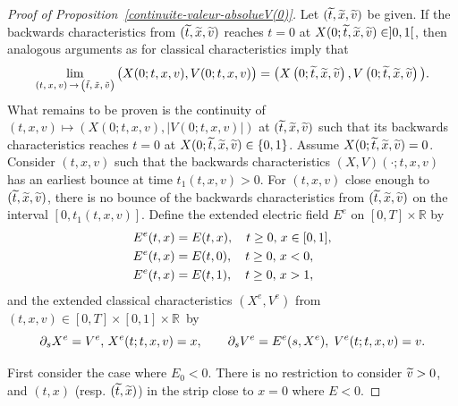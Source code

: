 \documentclass[10pt]{amsart}
\theoremstyle{definition}\newtheorem{defi}[theo]{Definition}\newtheorem{rema}[theo]{Remark}\newtheorem{exam}[theo]{Example}\newtheorem{exem}[theo]{Example}\newtheorem{nota}[theo]{Notation}
\newcommand{\R}{\mathbb{R}}
\let\oldtilde\tilde
\renewcommand*{\tilde}[1]{\mathchoice{\widetilde{#1}}{\widetilde{#1}}{\oldtilde{#1}}{\oldtilde{#1}}}
\begin{document}
\begin{proof}[{Proof of Proposition~\ref{continuite-valeur-absolueV(0)}}]
Let $(\tilde{t},\tilde{x},\tilde{v})$ be given. If the backwards characteristics from $(\tilde{t},\tilde{x},\tilde{v})$ reaches $t= 0$ at $X(0;\tilde{t},\tilde{x},\tilde{v})\in]0,1[$, then analogous arguments as for classical characteristics imply that
\[
\lim _{(t,\,x,\,v)\,\rightarrow\,\left(\tilde{t},\,\tilde{x},\,\tilde{v}\right)}\big(X(0;t,x,v), V(0;t,x,v)\big) = \big(X\left(0;\tilde{t},\tilde{x},\tilde{v}\right), V\left(0;\tilde{t},\tilde{x},\tilde{v}\right)\big).
\]
What remains to be proven is the continuity of $(t,x,v) \mapsto (X(0;t,x,v),|V(0;t,x,v)|)$ at $(\tilde{t},\tilde{x},\tilde{v})$ such that its backwards characteristics reaches $t= 0$ at $X(0;\tilde{t},\tilde{x},\tilde{v})\in \{ 0,1\} $. Assume $X(0;\tilde{t},\tilde{x},\tilde{v})= 0$. Consider $(t,x,v)$ such that the backwards characteristics $(X,V)(\cdot;t,x,v)$ has an earliest bounce at time $t_1(t,x,v)>0$. For $(t,x,v)$ close enough to $(\tilde{t},\tilde{x},\tilde{v})$, there is no bounce of the backwards characteristics from $(\tilde{t},\tilde{x},\tilde{v})$ on the interval $[0,t_1(t,x,v)]$. Define the extended electric field $E^e$ on $[0,T] \times
\R $ by
\begin{align*}
E^e(t,x) &= E(t,x),\quad t\geq0,\hspace*{0.02in}x\in [0,1],\\
E^e(t,x) &= E(t,0),\quad t\geq 0,\hspace*{0.02in}x<0,\\
E^e(t,x) &= E(t,1),\quad t\geq 0,\hspace*{0.02in}x>1,
\end{align*}
and the extended classical characteristics $(X^e,V^e)$ from $(t,x,v)\in [0,T]
\times [0,1] \times \R $~by
\[
\partial _sX^e= V^e,\hspace*{0.02in} X^e(t;t,x,v)= x,\quad \quad \partial _sV^e= E^e(s,X^e),\; V^e(t;t,x,v)= v.
\]

First consider the case where $E_0<0$. There is no restriction to consider $\tilde{v}>0$, and $(t,x)$ (resp. $(\tilde{t},\tilde{x})$) in the strip close to $x=0$ where $E<0$. 



\end{proof}
\end{document}
